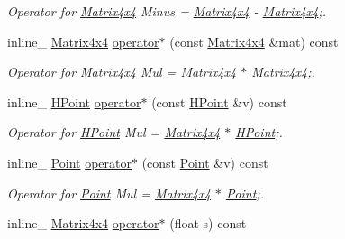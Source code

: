 \begin{DoxyCompactItemize}
\begin{DoxyCompactList}\small\item\em Operator for \hyperlink{classMatrix4x4}{Matrix4x4} Minus = \hyperlink{classMatrix4x4}{Matrix4x4} -\/ \hyperlink{classMatrix4x4}{Matrix4x4};. \end{DoxyCompactList}\item 
inline\+\_\+ \hyperlink{classMatrix4x4}{Matrix4x4} \hyperlink{classMatrix4x4_a132acb947401a0bc2234734f7ab21d0f}{operator$\ast$} (const \hyperlink{classMatrix4x4}{Matrix4x4} \&mat) const \hypertarget{classMatrix4x4_a132acb947401a0bc2234734f7ab21d0f}{}\label{classMatrix4x4_a132acb947401a0bc2234734f7ab21d0f}

\begin{DoxyCompactList}\small\item\em Operator for \hyperlink{classMatrix4x4}{Matrix4x4} Mul = \hyperlink{classMatrix4x4}{Matrix4x4} $\ast$ \hyperlink{classMatrix4x4}{Matrix4x4};. \end{DoxyCompactList}\item 
inline\+\_\+ \hyperlink{classHPoint}{H\+Point} \hyperlink{classMatrix4x4_a8b7f21ba3d530e8bcf9185316fbfb67c}{operator$\ast$} (const \hyperlink{classHPoint}{H\+Point} \&v) const \hypertarget{classMatrix4x4_a8b7f21ba3d530e8bcf9185316fbfb67c}{}\label{classMatrix4x4_a8b7f21ba3d530e8bcf9185316fbfb67c}

\begin{DoxyCompactList}\small\item\em Operator for \hyperlink{classHPoint}{H\+Point} Mul = \hyperlink{classMatrix4x4}{Matrix4x4} $\ast$ \hyperlink{classHPoint}{H\+Point};. \end{DoxyCompactList}\item 
inline\+\_\+ \hyperlink{classPoint}{Point} \hyperlink{classMatrix4x4_a3eafefe4cd0c934439f88831f4b0864a}{operator$\ast$} (const \hyperlink{classPoint}{Point} \&v) const \hypertarget{classMatrix4x4_a3eafefe4cd0c934439f88831f4b0864a}{}\label{classMatrix4x4_a3eafefe4cd0c934439f88831f4b0864a}

\begin{DoxyCompactList}\small\item\em Operator for \hyperlink{classPoint}{Point} Mul = \hyperlink{classMatrix4x4}{Matrix4x4} $\ast$ \hyperlink{classPoint}{Point};. \end{DoxyCompactList}\item 
inline\+\_\+ \hyperlink{classMatrix4x4}{Matrix4x4} \hyperlink{classMatrix4x4_a809c4a13de14973308a8cabc74409990}{operator$\ast$} (float s) const \hypertarget{classMatrix4x4_a809c4a13de14973308a8cabc74409990}{}\label{classMatrix4x4_a809c4a13de14973308a8cabc74409990}


\end{DoxyCompactItemize}
